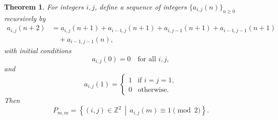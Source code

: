 \documentclass{article}
\theoremstyle{definition}
\theoremstyle{plain}
\newtheorem{theorem}[definition]{Theorem}
\theoremstyle{remark}
\begin{document}
\begin{theorem}
For integers $i,j$, define a sequence of integers $\{ a_{i,j}(n) \}_{n \ge 0}$ recursively by
\begin{align*}
a_{i,j}(n+2) &=
a_{i,j}(n+1) + a_{i-1,j}(n+1) + a_{i,j-1}(n+1) + a_{i-1,j-1}(n+1) \\
&\quad + a_{i-1,j-1}(n),
\end{align*}
with initial conditions
\[
a_{i,j}(0) = 0 \quad \text{for all } i,j,
\]
and
\[
a_{i,j}(1) =
\begin{cases}
1 & \text{if } i=j=1, \\
0 & \text{otherwise}.
\end{cases}
\]
Then
\[
P_{m,m}
=
\left\{ (i,j) \in \mathbb{Z}^2 \,\middle|\,
a_{i,j}(m) \equiv 1 \pmod{2}
\right\}.
\]
\end{theorem}
\end{document}

